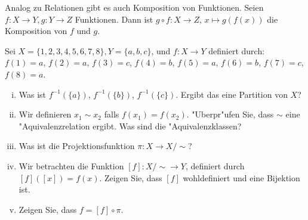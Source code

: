 Analog zu Relationen gibt es auch Komposition von Funktionen. Seien $f:X\to Y, g:Y\to Z$ Funktionen. Dann ist $g\circ f:X\to Z$, $x\mapsto g(f(x))$ die Komposition von $f$ und $g$.

Sei $X = \{1,2,3,4,5,6,7,8\}, Y=\{a,b,c\}$, und $f:X\to Y$ definiert durch: $f(1) = a$, $f(2) = a$, $f(3) = c$, $f(4) = b$, $f(5) = a$, $f(6) = b$, $f(7) = c$, $f(8) = a$. 
  \begin{enumerate}[(i)]
    \item Was ist $f^{-1}(\{a\})$, $f^{-1}(\{b\})$, $f^{-1}(\{c\})$. Ergibt das eine Partition von $X$? 
    \item Wir definieren $x_1\sim x_2$ falls $f(x_1) = f(x_2)$. "Uberpr"ufen Sie, dass $\sim$ eine "Aquivalenzrelation ergibt. Was sind die "Aquivalenzklassen? 
    \item Was ist die Projektionsfunktion $\pi : X\to X/\sim$?
    \item Wir betrachten die Funktion $[f] : X/\sim\to Y$, definiert durch $[f]([x]) = f(x)$. Zeigen Sie, dass $[f]$ wohldefiniert und eine Bijektion ist. 
   \item Zeigen Sie, dass $f = [f]\circ\pi$.
  \end{enumerate}

